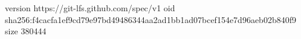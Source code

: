 version https://git-lfs.github.com/spec/v1
oid sha256:f4cacfa1ef9cd79e97bd49486344aa2ad1bb1ad07bcef154e7d96aeb02b840f9
size 380444
